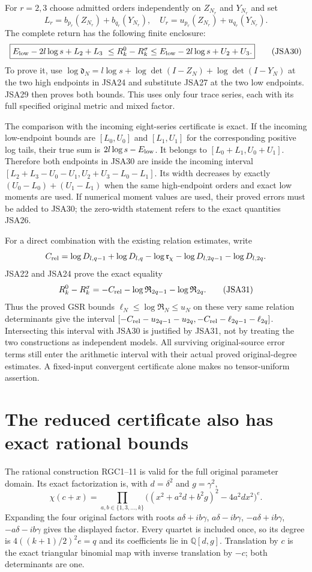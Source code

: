 For $r=2,3$ choose admitted orders independently on $Z_{N_r}$
and $Y_{N_r}$ and set
\[
 L_r=b_{p_r}(Z_{N_r})+b_{q_r}(Y_{N_r}),\quad
 U_r=u_{p_r}(Z_{N_r})+u_{q_r}(Y_{N_r}).
\]
The complete return has the following finite enclosure:
\[
 \boxed{
 E_{\rm low}-2l\log s+L_2+L_3
 \ \leq R_k^0-R_k^\sigma\leq
 E_{\rm low}-2l\log s+U_2+U_3.}
\tag{JSA30}
\]
To prove it, use
$\log\mathfrak d_N=l\log s+
\log\det(I-Z_N)+\log\det(I-Y_N)$
at the two high endpoints in JSA24 and substitute JSA27 at
the two low endpoints. JSA29 then proves both bounds. This
uses only four trace series, each with its full specified
original metric and mixed factor.

The comparison with the incoming eight-series certificate is
exact. If the incoming low-endpoint bounds are $[L_0,U_0]$
and $[L_1,U_1]$ for the corresponding positive log tails, their
true sum is $2l\log s-E_{\rm low}$. It belongs to
$[L_0+L_1,U_0+U_1]$. Therefore both endpoints in JSA30 are
inside the incoming interval
$[L_2+L_3-U_0-U_1,U_2+U_3-L_0-L_1]$. Its width decreases by
exactly $(U_0-L_0)+(U_1-L_1)$ when the same high-endpoint
orders and exact low moments are used. If numerical moment
values are used, their proved errors must be added to JSA30;
the zero-width statement refers to the exact quantities JSA26.

For a direct combination with the existing relation estimates,
write
\[
 C_{\rm rel}=\log D_{l,q-1}+\log D_{l,q}
       -\log\mathfrak r_\chi-\log D_{l,2q-1}-\log D_{l,2q}.
\]
JSA22 and JSA24 prove the exact equality
\[
 R_k^0-R_k^\sigma=-C_{\rm rel}
                      -\log\mathfrak R_{2q-1}-\log\mathfrak R_{2q}.
\tag{JSA31}
\]
Thus the proved GSR bounds $\ell_N\leq\log\mathfrak R_N\leq u_N$
on these very same relation determinants give the interval
$[-C_{\rm rel}-u_{2q-1}-u_{2q},
  -C_{\rm rel}-\ell_{2q-1}-\ell_{2q}]$.
Intersecting this interval with JSA30 is justified by JSA31,
not by treating the two constructions as independent models.
All surviving original-source error terms still enter the
arithmetic interval with their actual proved original-degree
estimates. A fixed-input convergent certificate alone makes
no tensor-uniform assertion.

\section{The reduced certificate also has exact rational bounds}

The rational construction RGC1--11 is valid for the full original
parameter domain. Its exact factorization is, with $d=\delta^2$
and $g=\gamma^2$,
\[
 \chi(c+x)=\prod_{a,b\in\{1,3,\ldots,k\}}
  \big((x^2+a^2d+b^2g)^2-4a^2dx^2\big)^e.
\tag{JSA32}
\]
Expanding the four original factors with roots
$a\delta+ib\gamma$, $a\delta-ib\gamma$,
$-a\delta+ib\gamma$, $-a\delta-ib\gamma$ gives the displayed
factor. Every quartet is included once, so its degree is
$4((k+1)/2)^2e=q$ and its coefficients lie in $\mathbb Q[d,g]$.
Translation by $c$ is the exact triangular binomial map with
inverse translation by $-c$; both determinants are one.

